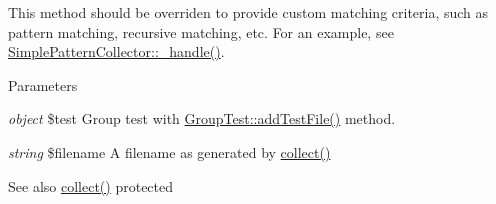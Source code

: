 This method should be overriden to provide custom matching criteria, such as pattern matching, recursive matching, etc. For an example, see \hyperlink{class_simple_pattern_collector_a862100ed3f4249ef9360f473aa95e75d}{SimplePatternCollector::\_\-handle()}.


\begin{DoxyParams}{Parameters}
\item[{\em object}]\$test Group test with \hyperlink{}{GroupTest::addTestFile()} method. \item[{\em string}]\$filename A filename as generated by \hyperlink{class_simple_collector_a0dcaa770d0dd18b8be96ecb26170a80d}{collect()} \end{DoxyParams}
\begin{DoxySeeAlso}{See also}
\hyperlink{class_simple_collector_a0dcaa770d0dd18b8be96ecb26170a80d}{collect()}  protected 
\end{DoxySeeAlso}


